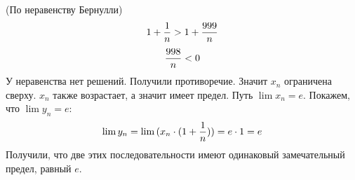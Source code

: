     \newline
    (По неравенству Бернулли)
    \newline
    $$1 + {1 \over n} > 1 + {999 \over n}$$
    \newline
    $${998 \over n} < 0$$
    \newline
    У неравенства нет решений. Получили противоречие. Значит $x_n$ ограничена сверху. $x_n$ также возрастает, а значит имеет предел.
    \newline
    \newline
    Путь $\lim{x_n} = e$. Покажем, что $\lim{y_n} = e$:
    \newline
    \newline
    $$\lim{y_n} = \lim{(x_n \cdot (1 + {1 \over n}))} = e \cdot 1 = e$$
    \newline
    \newline
    Получили, что две этих последовательности имеют одинаковый замечательный предел, равный $e$.
    
    
\newpage
